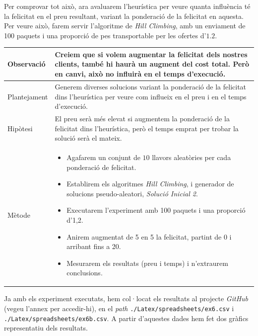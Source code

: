 \documentclass[a4paper]{article}
\begin{document}
	Per comprovar tot això, ara avaluarem l'heurística per veure quanta influència té la felicitat en el preu resultant, variant la ponderació de la felicitat en aquesta. Per veure això, farem servir l'algoritme de \textit{Hill Climbing}, amb un enviament de 100 paquets i una proporció de pes transportable per les ofertes d'$1.2$.
	
	\begin{table}[H]
		\centering
		\begin{tabular}{|l|p{10cm}|}
			\hline
			Observació & Creiem que si volem augmentar la felicitat dels nostres clients, també hi haurà un augment del cost total. Però en canvi, això no influirà en el temps d'execució. \\
			\hline
			Plantejament & Generem diverses solucions variant la ponderació de la felicitat dins l'heurística per veure com influeix en el preu i en el temps d'execució. \\
			\hline
			Hipòtesi & El preu serà més elevat si augmentem la ponderació de la felicitat dins l'heurística, però el temps emprat per trobar la solució serà el mateix. \\
			\hline
			Mètode & 
			\begin{itemize}
				\item Agafarem un conjunt de $10$ llavors aleatòries per cada ponderació de felicitat.
				\item Establirem els algoritmes \textit{Hill Climbing}, i generador de solucions pseudo-aleatori, \textit{Solució Inicial 2}.
				\item Executarem l'experiment amb 100 paquets i una proporció d'1,2.
				\item Anirem augmentat de 5 en 5 la felicitat, partint de 0 i arribant fins a 20.
				\item Mesurarem els resultats (preu i temps) i n'extraurem conclusions.
			\end{itemize} \\
			\hline
		\end{tabular}
		\label{tab:exp6_apartats}
	\end{table}
	
	Ja amb els experiment executats, hem col·locat els resultats al projecte \textit{GitHub} (vegeu l'annex per accedir-hi), en el \textit{path} \texttt{./Latex/spreadsheets/ex6.csv} i \texttt{./Latex/spreadsheets/ex6b.csv}. A partir d'aquestes dades hem fet dos gràfics representatiu dels resultats.
	
\end{document}
